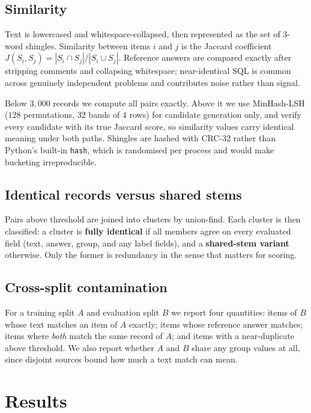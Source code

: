 \documentclass[11pt]{article}
\begin{document}
\subsection{Similarity}

Text is lowercased and whitespace-collapsed, then represented as the set of
$3$-word shingles. Similarity between items $i$ and $j$ is the Jaccard
coefficient $J(S_i, S_j) = |S_i \cap S_j| / |S_i \cup S_j|$. Reference answers
are compared exactly after stripping comments and collapsing whitespace;
near-identical SQL is common across genuinely independent problems and
contributes noise rather than signal.

Below $3{,}000$ records we compute all pairs exactly. Above it we use
MinHash-LSH ($128$ permutations, $32$ bands of $4$ rows) for candidate
generation only, and verify every candidate with its true Jaccard score, so
similarity values carry identical meaning under both paths. Shingles are hashed
with CRC-32 rather than Python's built-in \texttt{hash}, which is randomised
per process and would make bucketing irreproducible.

\subsection{Identical records versus shared stems}

Pairs above threshold are joined into clusters by union-find. Each cluster is
then classified: a cluster is \textbf{fully identical} if all members agree on
every evaluated field (text, answer, group, and any label fields), and a
\textbf{shared-stem variant} otherwise. Only the former is redundancy in the
sense that matters for scoring.

\subsection{Cross-split contamination}

For a training split $A$ and evaluation split $B$ we report four quantities:
items of $B$ whose text matches an item of $A$ exactly; items whose reference
answer matches; items where \emph{both} match the same record of $A$; and items
with a near-duplicate above threshold. We also report whether $A$ and $B$ share
any group values at all, since disjoint sources bound how much a text match can
mean.

\section{Results}
\end{document}
